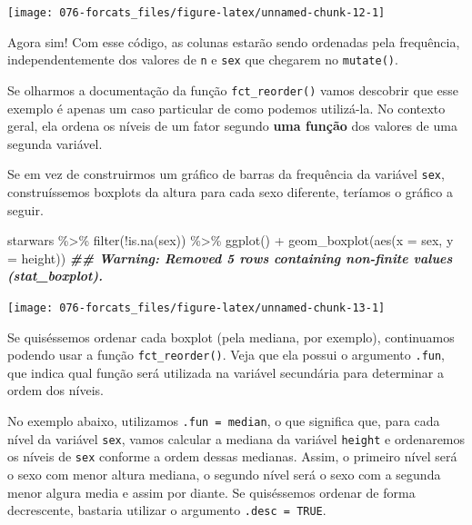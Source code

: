 \documentclass[
]{book}
\newenvironment{Shaded}{\begin{snugshade}}{\end{snugshade}}
\newcommand{\AttributeTok}[1]{\textcolor[rgb]{0.77,0.63,0.00}{#1}}
\newcommand{\DocumentationTok}[1]{\textcolor[rgb]{0.56,0.35,0.01}{\textbf{\textit{#1}}}}
\newcommand{\FunctionTok}[1]{\textcolor[rgb]{0.00,0.00,0.00}{#1}}
\newcommand{\NormalTok}[1]{#1}
\newcommand{\SpecialCharTok}[1]{\textcolor[rgb]{0.00,0.00,0.00}{#1}}
\begin{document}
\begin{center}\texttt{[image: 076-forcats\_files/figure-latex/unnamed-chunk-12-1]} \end{center}

Agora sim! Com esse código, as colunas estarão sendo ordenadas pela frequência, independentemente dos valores de \texttt{n} e \texttt{sex} que chegarem no \texttt{mutate()}.

Se olharmos a documentação da função \texttt{fct\_reorder()} vamos descobrir que esse exemplo é apenas um caso particular de como podemos utilizá-la. No contexto geral, ela ordena os níveis de um fator segundo \textbf{uma função} dos valores de uma segunda variável.

Se em vez de construirmos um gráfico de barras da frequência da variável \texttt{sex}, construíssemos boxplots da altura para cada sexo diferente, teríamos o gráfico a seguir.

\begin{Shaded}
\begin{Highlighting}[]
\NormalTok{starwars }\SpecialCharTok{\%\textgreater{}\%} 
  \FunctionTok{filter}\NormalTok{(}\SpecialCharTok{!}\FunctionTok{is.na}\NormalTok{(sex)) }\SpecialCharTok{\%\textgreater{}\%} 
  \FunctionTok{ggplot}\NormalTok{() }\SpecialCharTok{+}
  \FunctionTok{geom\_boxplot}\NormalTok{(}\FunctionTok{aes}\NormalTok{(}\AttributeTok{x =}\NormalTok{ sex, }\AttributeTok{y =}\NormalTok{ height))}
\DocumentationTok{\#\# Warning: Removed 5 rows containing non{-}finite values (stat\_boxplot).}
\end{Highlighting}
\end{Shaded}

\begin{center}\texttt{[image: 076-forcats\_files/figure-latex/unnamed-chunk-13-1]} \end{center}

Se quiséssemos ordenar cada boxplot (pela mediana, por exemplo), continuamos podendo usar a função \texttt{fct\_reorder()}. Veja que ela possui o argumento \texttt{.fun}, que indica qual função será utilizada na variável secundária para determinar a ordem dos níveis.

No exemplo abaixo, utilizamos \texttt{.fun\ =\ median}, o que significa que, para cada nível da variável \texttt{sex}, vamos calcular a mediana da variável \texttt{height} e ordenaremos os níveis de \texttt{sex} conforme a ordem dessas medianas. Assim, o primeiro nível será o sexo com menor altura mediana, o segundo nível será o sexo com a segunda menor algura media e assim por diante. Se quiséssemos ordenar de forma decrescente, bastaria utilizar o argumento \texttt{.desc\ =\ TRUE}.
\end{document}
